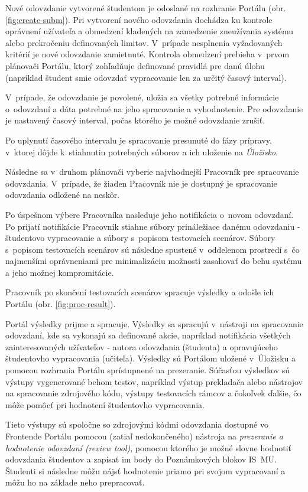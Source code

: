 \documentclass[
  digital, %
  oneside, %
  table,   %
  lof,     %
  lot,   %
]{fithesis3}
\begin{document}
Nové odovzdanie vytvorené študentom je odoslané na rozhranie Portálu (obr. \ref{fig:create-subm}). Pri vytvorení nového odovzdania dochádza ku kontrole oprávnení užívateľa a obmedzení kladených na zamedzenie zneužívania systému alebo prekročeniu definovaných limitov. V~prípade nesplnenia vyžadovaných kritérií je nové odovzdanie zamietnuté. Kontrola obmedzení prebieha v~prvom plánovači Portálu, ktorý zohľadňuje definované pravidlá pre danú úlohu (napríklad študent smie odovzdať vypracovanie len za určitý časový interval).

V~prípade, že odovzdanie je povolené, uložia sa všetky potrebné informácie o~odovzdaní a dáta potrebné na jeho spracovanie a vyhodnotenie. Pre odovzdanie je nastavený časový interval, počas ktorého je možné odovzdanie zrušiť.

Po uplynutí časového intervalu je spracovanie presunuté do fázy prípravy, v~ktorej dôjde k~stiahnutiu potrebných súborov a ich uloženie na \emph{Úložisko}.

Následne sa v~druhom plánovači vyberie najvhodnejší Pracovník pre spracovanie odovzdania. V~prípade, že žiaden Pracovník nie je dostupný je spracovanie odovzdania odložené na neskôr.

Po úspešnom výbere Pracovníka nasleduje jeho notifikácia o~novom odovzdaní. Po prijatí notifikácie Pracovník stiahne súbory prináležiace danému odovzdaniu - študentovo vypracovanie a súbory s~popisom testovacích scenárov. Súbory s~popisom testovacích scenárov sú následne spustené v~oddelenom prostredí s~čo najmenšími oprávneniami pre minimalizáciu možnosti zasahovať do behu systému a jeho možnej kompromitácie.

Pracovník po skončení testovacích scenárov spracuje výsledky a odošle ich Portálu (obr. \ref{fig:proc-result}).

Portál výsledky prijme a spracuje. Výsledky sa spracujú v~nástroji na spracovanie odovzdaní, kde sa vykonajú sa definované akcie, napríklad notifikácia všetkých zainteresovaných užívateľov - autora odovzdania (študenta) a opravujúceho študentovho vypracovania (učiteľa). Výsledky sú Portálom uložené v~Úložisku a pomocou rozhrania Portálu sprístupnené na prezeranie. Súčasťou výsledkov sú výstupy vygenerované behom testov, napríklad výstup prekladača alebo nástrojov na spracovanie zdrojového kódu, výstupy testovacích rámcov a čokoľvek ďalšie, čo môže pomôcť pri hodnotení študentovho vypracovania.

Tieto výstupy sú spoločne so zdrojovými kódmi odovzdania dostupné vo Frontende Portálu pomocou (zatiaľ nedokončeného) nástroja na \emph{prezeranie a hodnotenie odovzdaní (review tool)}, pomocou ktorého je možné slovne hodnotiť odovzdania študentov a zapísať im body do Poznámkových blokov IS~MU. Študenti si následne môžu nájsť hodnotenie priamo pri svojom vypracovaní a môžu ho na základe neho prepracovať. 
\end{document}
